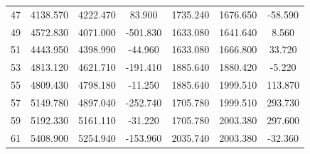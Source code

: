 \begin{table}[t]
\begin{tabular}{ccccccc}
47 & 4138.570 & 4222.470 & 83.900 & 1735.240 & 1676.650 & -58.590 \\
49 & 4572.830 & 4071.000 & -501.830 & 1633.080 & 1641.640 & 8.560 \\
51 & 4443.950 & 4398.990 & -44.960 & 1633.080 & 1666.800 & 33.720 \\
53 & 4813.120 & 4621.710 & -191.410 & 1885.640 & 1880.420 & -5.220 \\
55 & 4809.430 & 4798.180 & -11.250 & 1885.640 & 1999.510 & 113.870 \\
57 & 5149.780 & 4897.040 & -252.740 & 1705.780 & 1999.510 & 293.730 \\
59 & 5192.330 & 5161.110 & -31.220 & 1705.780 & 2003.380 & 297.600 \\
61 & 5408.900 & 5254.940 & -153.960 & 2035.740 & 2003.380 & -32.360 \\
\hline
\end{tabular}
\end{table}
